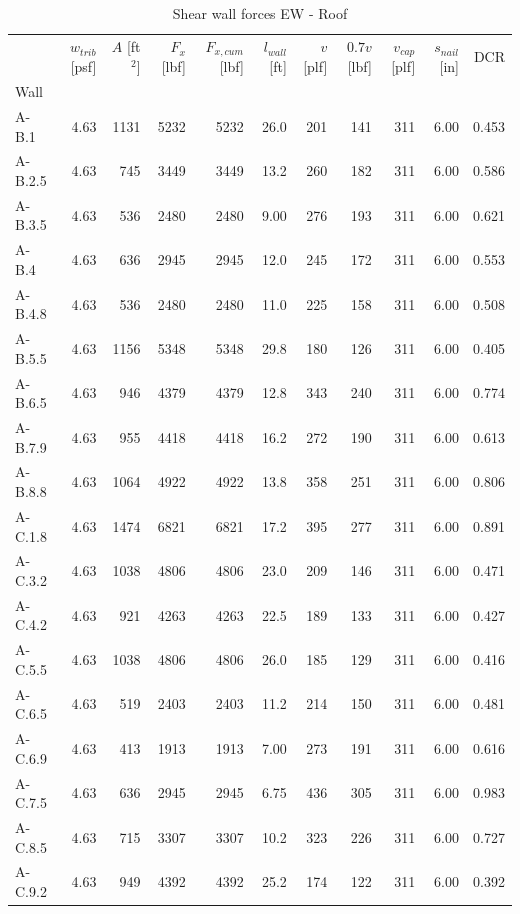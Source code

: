 \documentclass[11pt]{article}
\begin{document}
    \begin{table}[H]
\centering
\caption{Shear wall forces EW - Roof}
\label{tab:shear_wall_forces_roof_ew}
\begin{tabular}{lrrrrrrrrrr}
\toprule
 & $w_{trib}$ [psf] & $A$ [ft$^2$] & $F_x$ [lbf] & $F_{x,cum}$ [lbf] & $l_{wall}$ [ft] & $v$ [plf] & $0.7 v$ [lbf] & $v_{cap}$ [plf] & $s_{nail}$ [in] & DCR \\
Wall &  &  &  &  &  &  &  &  &  &  \\
\midrule
A-B.1 & 4.63 & 1131 & 5232 & 5232 & 26.0 & 201 & 141 & 311 & 6.00 & 0.453 \\
A-B.2.5 & 4.63 & 745 & 3449 & 3449 & 13.2 & 260 & 182 & 311 & 6.00 & 0.586 \\
A-B.3.5 & 4.63 & 536 & 2480 & 2480 & 9.00 & 276 & 193 & 311 & 6.00 & 0.621 \\
A-B.4 & 4.63 & 636 & 2945 & 2945 & 12.0 & 245 & 172 & 311 & 6.00 & 0.553 \\
A-B.4.8 & 4.63 & 536 & 2480 & 2480 & 11.0 & 225 & 158 & 311 & 6.00 & 0.508 \\
A-B.5.5 & 4.63 & 1156 & 5348 & 5348 & 29.8 & 180 & 126 & 311 & 6.00 & 0.405 \\
A-B.6.5 & 4.63 & 946 & 4379 & 4379 & 12.8 & 343 & 240 & 311 & 6.00 & 0.774 \\
A-B.7.9 & 4.63 & 955 & 4418 & 4418 & 16.2 & 272 & 190 & 311 & 6.00 & 0.613 \\
A-B.8.8 & 4.63 & 1064 & 4922 & 4922 & 13.8 & 358 & 251 & 311 & 6.00 & 0.806 \\
A-C.1.8 & 4.63 & 1474 & 6821 & 6821 & 17.2 & 395 & 277 & 311 & 6.00 & 0.891 \\
A-C.3.2 & 4.63 & 1038 & 4806 & 4806 & 23.0 & 209 & 146 & 311 & 6.00 & 0.471 \\
A-C.4.2 & 4.63 & 921 & 4263 & 4263 & 22.5 & 189 & 133 & 311 & 6.00 & 0.427 \\
A-C.5.5 & 4.63 & 1038 & 4806 & 4806 & 26.0 & 185 & 129 & 311 & 6.00 & 0.416 \\
A-C.6.5 & 4.63 & 519 & 2403 & 2403 & 11.2 & 214 & 150 & 311 & 6.00 & 0.481 \\
A-C.6.9 & 4.63 & 413 & 1913 & 1913 & 7.00 & 273 & 191 & 311 & 6.00 & 0.616 \\
A-C.7.5 & 4.63 & 636 & 2945 & 2945 & 6.75 & 436 & 305 & 311 & 6.00 & 0.983 \\
A-C.8.5 & 4.63 & 715 & 3307 & 3307 & 10.2 & 323 & 226 & 311 & 6.00 & 0.727 \\
A-C.9.2 & 4.63 & 949 & 4392 & 4392 & 25.2 & 174 & 122 & 311 & 6.00 & 0.392 \\
\bottomrule
\end{tabular}
\end{table}
\end{document}
